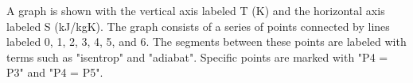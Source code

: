 A graph is shown with the vertical axis labeled T (K) and the horizontal axis labeled S (kJ/kgK). The graph consists of a series of points connected by lines labeled 0, 1, 2, 3, 4, 5, and 6. The segments between these points are labeled with terms such as "isentrop" and "adiabat". Specific points are marked with "P4 = P3" and "P4 = P5".